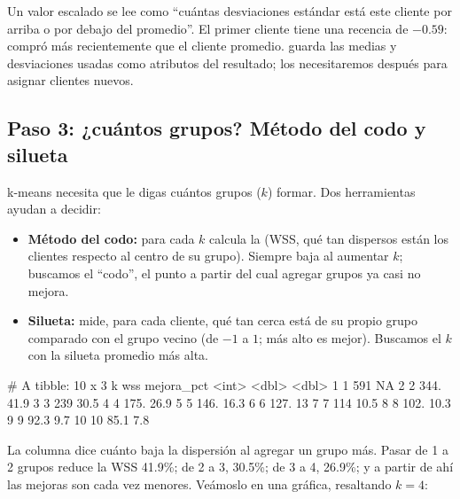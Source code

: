 Un valor escalado se lee como ``cuántas desviaciones estándar está este cliente
por arriba o por debajo del promedio''. El primer cliente tiene una recencia de
$-0.59$: compró más recientemente que el cliente promedio. 
guarda las medias y desviaciones usadas como atributos del resultado; los
necesitaremos después para asignar clientes nuevos.

\subsection{Paso 3: ¿cuántos grupos? Método del codo y silueta}

k-means necesita que le digas cuántos grupos ($k$) formar. Dos herramientas
ayudan a decidir:

\begin{itemize}
  \item \textbf{Método del codo:} para cada $k$ calcula la
         (WSS, qué tan
        dispersos están los clientes respecto al centro de su grupo). Siempre
        baja al aumentar $k$; buscamos el ``codo'', el punto a partir del cual
        agregar grupos ya casi no mejora.
  \item \textbf{Silueta:} mide, para cada cliente, qué tan cerca está de su
        propio grupo comparado con el grupo vecino (de $-1$ a $1$; más alto es
        mejor). Buscamos el $k$ con la silueta promedio más alta.
\end{itemize}


\begin{rsalida}
# A tibble: 10 x 3
       k   wss mejora_pct
   <int> <dbl>      <dbl>
 1     1 591         NA  
 2     2 344.        41.9
 3     3 239         30.5
 4     4 175.        26.9
 5     5 146.        16.3
 6     6 127.        13  
 7     7 114         10.5
 8     8 102.        10.3
 9     9  92.3        9.7
10    10  85.1        7.8
\end{rsalida}

La columna  dice cuánto baja la dispersión al agregar un
grupo más. Pasar de 1 a 2 grupos reduce la WSS 41.9\%; de 2 a 3, 30.5\%; de 3 a
4, 26.9\%; y a partir de ahí las mejoras son cada vez menores. Veámoslo en una
gráfica, resaltando $k = 4$:

